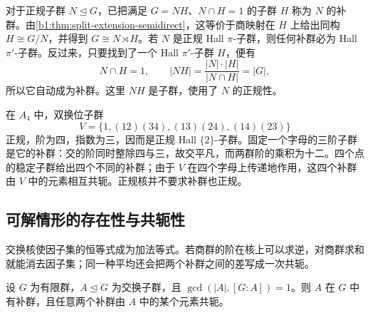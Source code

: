 \ProseParagraphBreak
对于正规子群 \(N\trianglelefteq G\)，已把满足 \(G=NH\)、\(N\cap H=1\) 的子群 \(H\) 称为 \(N\) 的补群。由\cref{b1:thm:split-extension-semidirect}，这等价于商映射在 \(H\) 上给出同构 \(H\cong G/N\)，并得到 \(G\cong N\rtimes H\)。若 \(N\) 是正规 Hall \(\pi\)-子群，则任何补群必为 Hall \(\pi'\)-子群。反过来，只要找到了一个 Hall \(\pi'\)-子群 \(H\)，便有
\[
	N\cap H=1,\qquad |NH|=\dfrac{|N|\cdot|H|}{|N\cap H|}=|G|,
\]
所以它自动成为补群。这里 \(NH\) 是子群，使用了 \(N\) 的正规性。

\ProseParagraphBreak
在 \(A_4\) 中，双换位子群
\[
	V=\{1,(12)(34),(13)(24),(14)(23)\}
\]
正规，阶为四，指数为三，因而是正规 Hall \(\{2\}\)-子群。固定一个字母的三阶子群是它的补群：交的阶同时整除四与三，故交平凡，而两群阶的乘积为十二。四个点的稳定子群给出四个不同的补群；由于 \(V\) 在四个字母上传递地作用，这四个补群由 \(V\) 中的元素相互共轭。正规核并不要求补群也正规。

\subsection{可解情形的存在性与共轭性}
\label{b1:subsec:C06:02}

交换核使因子集的恒等式成为加法等式。若商群的阶在核上可以求逆，对商群求和就能消去因子集；同一种平均还会把两个补群之间的差写成一次共轭。

\begin{lemma}[交换核的互素分裂]\label{b1:lem:C-coprime-abelian-complements}
	设 \(G\) 为有限群，\(A\trianglelefteq G\) 为交换子群，且 \(\gcd(|A|,[G:A])=1\)。则 \(A\) 在 \(G\) 中有补群，且任意两个补群由 \(A\) 中的某个元素共轭。
\end{lemma}

